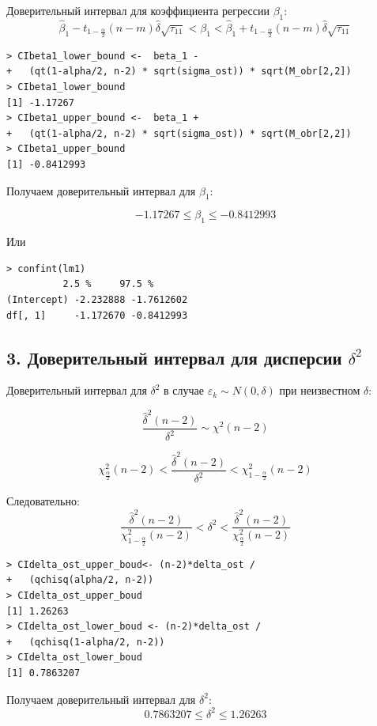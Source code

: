 \documentclass[14pt,a4paper]{scrartcl}
\begin{document}
Доверительный интервал для коэффициента регрессии $\beta_1$:
\begin{equation}
	\hat{\beta}_{1}-t_{1-\frac{\alpha}{2}}(n-m) \hat{\delta} \sqrt{\tau_{11}}<\beta_{1}<\hat{\beta}_{1}+t_{1-\frac{\alpha}{2}}(n-m) \hat{\delta} \sqrt{\tau_{11}}
\end{equation}

\begin{verbatim}
> CIbeta1_lower_bound <-  beta_1 - 
+   (qt(1-alpha/2, n-2) * sqrt(sigma_ost)) * sqrt(M_obr[2,2])
> CIbeta1_lower_bound
[1] -1.17267
> CIbeta1_upper_bound <-  beta_1 + 
+   (qt(1-alpha/2, n-2) * sqrt(sigma_ost)) * sqrt(M_obr[2,2])
> CIbeta1_upper_bound
[1] -0.8412993
\end{verbatim}

Получаем доверительный интервал для $\beta_1$:

\begin{equation*}
-1.17267 \leq \beta_1 \leq -0.8412993
\end{equation*}

Или
\begin{verbatim}
> confint(lm1)
	      2.5 %     97.5 %
(Intercept) -2.232888 -1.7612602
df[, 1]     -1.172670 -0.8412993
\end{verbatim}

\subsection*{3. Доверительный интервал для дисперсии $\delta^2$}

Доверительный интервал для $\delta^2$ в случае $\varepsilon_k \sim N(0,\delta)$ при неизвестном $\delta$:

\begin{equation*}
	\frac{\hat{\delta}^{2}(n-2)}{\delta^{2}} \sim \chi^{2}(n-2)	
\end{equation*}

\begin{equation*}
	\chi_{\frac{\alpha}{2}}^{2}(n-2)<\frac{\hat{\delta}^{2}(n-2)}{\delta^{2}}<\chi_{1-\frac{\alpha}{2}}^{2}(n-2)
\end{equation*}


Следовательно:
\begin{equation*}
\frac{\hat{\delta}^{2}(n-2)}{\chi_{1-\frac{\alpha}{2}}^{2}(n-2)}<\delta^{2}<\frac{\hat{\delta}^{2}(n-2)}{\chi_{\frac{\alpha}{2}}^{2}(n-2)}
\end{equation*}

\begin{verbatim}
> CIdelta_ost_upper_boud<- (n-2)*delta_ost / 
+   (qchisq(alpha/2, n-2))
> CIdelta_ost_upper_boud
[1] 1.26263
> CIdelta_ost_lower_boud <- (n-2)*delta_ost / 
+   (qchisq(1-alpha/2, n-2))
> CIdelta_ost_lower_boud
[1] 0.7863207
\end{verbatim}

Получаем доверительный интервал для $\delta^2$:
\begin{equation*}
	0.7863207 \leq \delta^2 \leq 1.26263
\end{equation*}
\end{document}
